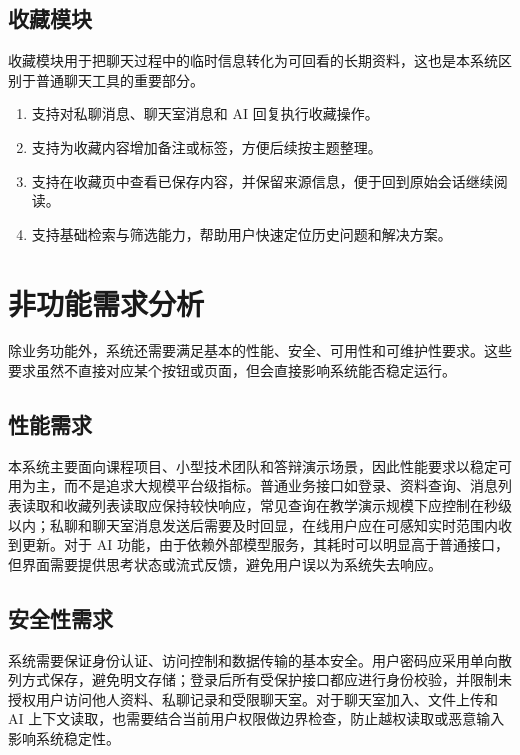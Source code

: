 \subsection{收藏模块}

收藏模块用于把聊天过程中的临时信息转化为可回看的长期资料，这也是本系统区别于普通聊天工具的重要部分。

\begin{enumerate}[label={(\arabic*)}, leftmargin=2.4em]
\item 支持对私聊消息、聊天室消息和 AI 回复执行收藏操作。
\item 支持为收藏内容增加备注或标签，方便后续按主题整理。
\item 支持在收藏页中查看已保存内容，并保留来源信息，便于回到原始会话继续阅读。
\item 支持基础检索与筛选能力，帮助用户快速定位历史问题和解决方案。
\end{enumerate}

\section{非功能需求分析}

除业务功能外，系统还需要满足基本的性能、安全、可用性和可维护性要求。这些要求虽然不直接对应某个按钮或页面，但会直接影响系统能否稳定运行。

\subsection{性能需求}

本系统主要面向课程项目、小型技术团队和答辩演示场景，因此性能要求以稳定可用为主，而不是追求大规模平台级指标。普通业务接口如登录、资料查询、消息列表读取和收藏列表读取应保持较快响应，常见查询在教学演示规模下应控制在秒级以内；私聊和聊天室消息发送后需要及时回显，在线用户应在可感知实时范围内收到更新。对于 AI 功能，由于依赖外部模型服务，其耗时可以明显高于普通接口，但界面需要提供思考状态或流式反馈，避免用户误以为系统失去响应\cite{restfulapitest2025}。

\subsection{安全性需求}

系统需要保证身份认证、访问控制和数据传输的基本安全。用户密码应采用单向散列方式保存，避免明文存储；登录后所有受保护接口都应进行身份校验，并限制未授权用户访问他人资料、私聊记录和受限聊天室。对于聊天室加入、文件上传和 AI 上下文读取，也需要结合当前用户权限做边界检查，防止越权读取或恶意输入影响系统稳定性\cite{imsecurity2024}。

